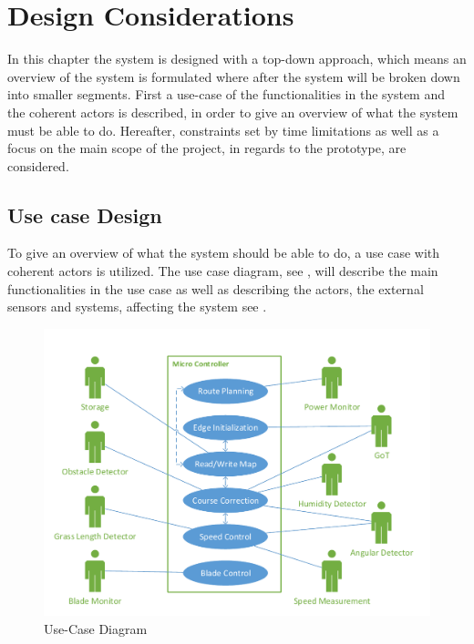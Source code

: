 \chapter{Design Considerations}
\vspace{-5 mm}
In this chapter the system is designed with a top-down approach, which means an overview of the system is formulated where after the system will be broken down into smaller segments. First a use-case of the functionalities in the system and the coherent actors is described, in order to give an overview of what the system must be able to do. Hereafter, constraints set by time limitations as well as a focus on the main scope of the project, in regards to the prototype, are considered.
\vspace{-4 mm}
\section{Use case Design}
To give an overview of what the system should be able to do, a use case with coherent actors is utilized. The use case diagram, see , will describe the main functionalities in the use case as well as describing the actors, the external sensors and systems, affecting the system see . 


\vspace{-3 mm}
 \begin{figure}[H]
	\centering
	\includegraphics[scale=0.8]{figures/P5UseCase.pdf}
	\caption{Use-Case Diagram}
	\label{fig:usecase}
\end{figure}

